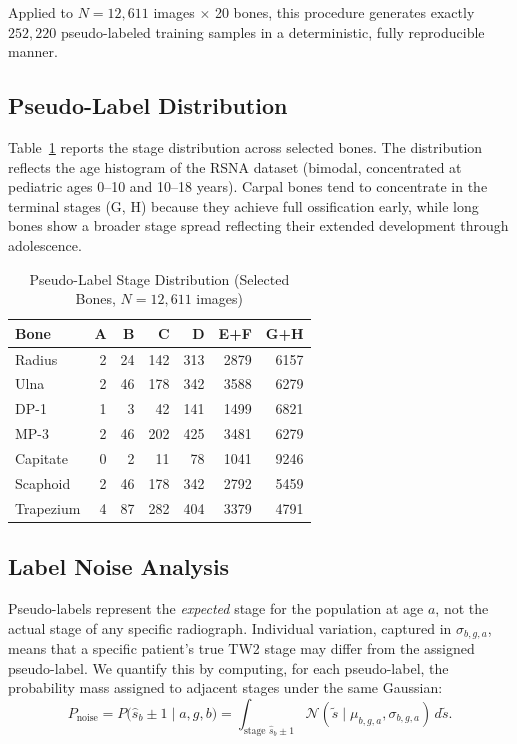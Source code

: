 \documentclass[journal]{IEEEtran}
\begin{document}
Applied to $N = 12{,}611$ images $\times$ 20 bones, this procedure
generates exactly $252{,}220$ pseudo-labeled training samples in
a deterministic, fully reproducible manner.

\subsection{Pseudo-Label Distribution}

Table~\ref{tab:pseudolabels} reports the stage distribution
across selected bones.
The distribution reflects the age histogram of the RSNA dataset
(bimodal, concentrated at pediatric ages 0--10 and 10--18 years).
Carpal bones tend to concentrate in the terminal stages (G, H)
because they achieve full ossification early, while long bones
show a broader stage spread reflecting their extended development
through adolescence.

\begin{table}[!t]
  \centering
  \caption{Pseudo-Label Stage Distribution (Selected Bones, $N{=}12{,}611$ images)}
  \label{tab:pseudolabels}
  \begin{tabular}{lrrrrrr}
    \toprule
    Bone & A & B & C & D & E+F & G+H \\
    \midrule
    Radius      &  2 &  24 & 142 & 313 & 2879 & 6157 \\
    Ulna        &  2 &  46 & 178 & 342 & 3588 & 6279 \\
    DP-1        &  1 &   3 &  42 & 141 & 1499 & 6821 \\
    MP-3        &  2 &  46 & 202 & 425 & 3481 & 6279 \\
    Capitate    &  0 &   2 &  11 &  78 & 1041 & 9246 \\
    Scaphoid    &  2 &  46 & 178 & 342 & 2792 & 5459 \\
    Trapezium   &  4 &  87 & 282 & 404 & 3379 & 4791 \\
    \bottomrule
  \end{tabular}
\end{table}

\subsection{Label Noise Analysis}

Pseudo-labels represent the \textit{expected} stage for the
population at age $a$, not the actual stage of any specific
radiograph.
Individual variation, captured in $\sigma_{b,g,a}$, means that
a specific patient's true TW2 stage may differ from the
assigned pseudo-label.
We quantify this by computing, for each pseudo-label, the
probability mass assigned to adjacent stages under the same
Gaussian:
\begin{equation}
  P_{\text{noise}} = P\bigl(\hat{s}_b \pm 1 \mid a, g, b\bigr)
  = \int_{\text{stage }\hat{s}_b \pm 1} \mathcal{N}(\tilde{s} \mid
    \mu_{b,g,a}, \sigma_{b,g,a}) \,d\tilde{s}.
\end{equation}
\end{document}
